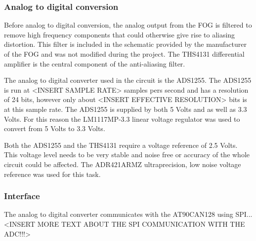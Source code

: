 \subsubsection{Analog to digital conversion}
Before analog to digital conversion, the analog output from the FOG is filtered to remove high frequency components that could otherwise give rise to aliasing distortion. This filter is included in the schematic provided by the manufacturer of the FOG and was not modified during the project. \newline
The THS4131 differential amplifier is the central component of the anti-aliasing filter. 

The analog to digital converter used in the circuit is the ADS1255. The ADS1255 is run at <INSERT SAMPLE RATE> samples pers second and has a resolution of 24 bits, however only about <INSERT EFFECTIVE RESOLUTION> bits is at this sample rate. \newline
The ADS1255 is supplied by both 5 Volts and as well as 3.3 Volts. For this reason the LM1117MP-3.3 linear voltage regulator was used to convert from 5 Volts to 3.3 Volts. 

Both the ADS1255 and the THS4131 require a voltage reference of 2.5 Volts. This voltage level needs to be very stable and noise free or accuracy of the whole circuit could be affected. The ADR421ARMZ ultraprecision, low noise voltage reference was used for this task.

\subsubsection{Interface}
The analog to digital converter communicates with the AT90CAN128 using SPI...  <INSERT MORE TEXT ABOUT THE SPI COMMUNICATION WITH THE ADC!!!>







\newpage